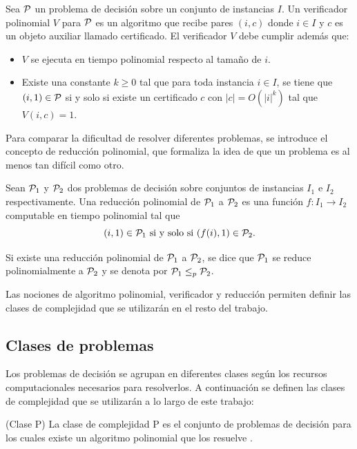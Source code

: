 \begin{definition}
	Sea $\mathcal{P}$ un problema de decisión sobre un conjunto de instancias $I$. Un verificador polinomial $V$ para $\mathcal{P}$ es un algoritmo que recibe pares $(i, c)$ donde $i \in I$ y $c$ es un objeto auxiliar llamado certificado. El verificador $V$ debe cumplir además que:
	\begin{itemize}
		\item $V$ se ejecuta en tiempo polinomial respecto al tamaño de $i$.
		\item Existe una constante $k \geq 0$ tal que para toda instancia $i \in I$, se tiene que $(i, 1) \in \mathcal{P}$ si y solo si existe un certificado $c$ con $|c| = O(|i|^k)$ tal que $V(i, c) = 1$.
	\end{itemize}
\end{definition}

Para comparar la dificultad de resolver diferentes problemas, se introduce el concepto de reducción polinomial, que formaliza la idea de que un problema es al menos tan difícil como otro.

\begin{definition}
	Sean $\mathcal{P}_1$ y $\mathcal{P}_2$ dos problemas de decisión sobre conjuntos de instancias $I_1$ e $I_2$ respectivamente. Una reducción polinomial de $\mathcal{P}_1$ a $\mathcal{P}_2$ es una función $f: I_1 \to I_2$ computable en tiempo polinomial tal que
	$$
		(i, 1) \in \mathcal{P}_1 \text{ si y solo si } (f(i), 1) \in \mathcal{P}_2.
	$$

	Si existe una reducción polinomial de $\mathcal{P}_1$ a $\mathcal{P}_2$, se dice que $\mathcal{P}_1$ se reduce polinomialmente a $\mathcal{P}_2$ y se denota por $\mathcal{P}_1 \leq_p \mathcal{P}_2$.
\end{definition}

Las nociones de algoritmo polinomial, verificador y reducción permiten definir las clases de complejidad que se utilizarán en el resto del trabajo.

\subsection{Clases de problemas}

Los problemas de decisión se agrupan en diferentes clases según los recursos computacionales necesarios para resolverlos. A continuación se definen las clases de complejidad que se utilizarán a lo largo de este trabajo:

\begin{definition}{(Clase P)}
	La clase de complejidad P es el conjunto de problemas de decisión para los cuales existe un algoritmo polinomial que los resuelve \cite{Cormen2009IntroductionTA}.
\end{definition}

